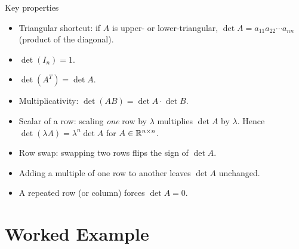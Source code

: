 \begin{rulebox}{Key properties}
\begin{itemize}[leftmargin=1.6em,itemsep=0.3ex]
  \item Triangular shortcut: if $A$ is upper- or lower-triangular,
        $\det A = a_{11} a_{22} \cdots a_{nn}$ (product of the diagonal).
  \item $\det(I_{n}) = 1$.
  \item $\det(A^{T}) = \det A$.
  \item Multiplicativity: $\det(A B) = \det A \cdot \det B$.
  \item Scalar of a row: scaling \emph{one} row by $\lambda$ multiplies
        $\det A$ by $\lambda$. Hence $\det(\lambda A) = \lambda^{n} \det A$
        for $A \in \mathbb{R}^{n \times n}$.
  \item Row swap: swapping two rows flips the sign of $\det A$.
  \item Adding a multiple of one row to another leaves $\det A$ unchanged.
  \item A repeated row (or column) forces $\det A = 0$.
\end{itemize}
\end{rulebox}

\section{Worked Example}

